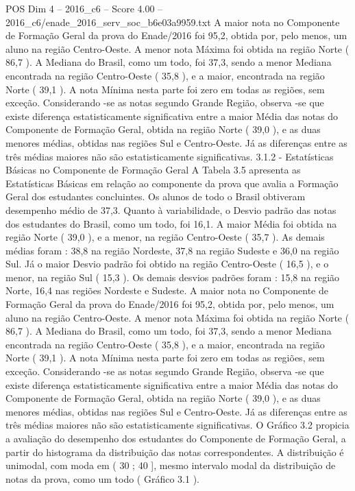 \begin{textsample}{POS Dim 4 – 2016\_c6 – Score 4.00 – 2016\_c6/enade\_2016\_serv\_soc\_b6e03a9959.txt}
A maior nota no Componente de Formação Geral da prova do Enade/2016 foi 95,2, obtida por, pelo menos, um aluno na região Centro-Oeste.
A menor nota Máxima foi obtida na região Norte ( 86,7 ).
A Mediana do Brasil, como um todo, foi 37,3, sendo a menor Mediana encontrada na região Centro-Oeste ( 35,8 ), e a maior, encontrada na região Norte ( 39,1 ).
A nota Mínima nesta parte foi zero em todas as regiões, sem exceção.
Considerando -se as notas segundo Grande Região, observa -se que existe diferença estatisticamente significativa entre a maior Média das notas do Componente de Formação Geral, obtida na região Norte ( 39,0 ), e as duas menores médias, obtidas nas regiões Sul e Centro-Oeste.
Já as diferenças entre as três médias maiores não são estatisticamente significativas. 3.1.2 - Estatísticas Básicas no Componente de Formação Geral A Tabela 3.5 apresenta as Estatísticas Básicas em relação ao componente da prova que avalia a Formação Geral dos estudantes concluintes.
Os alunos de todo o Brasil obtiveram desempenho médio de 37,3.
Quanto à variabilidade, o Desvio padrão das notas dos estudantes do Brasil, como um todo, foi 16,1.
A maior Média foi obtida na região Norte ( 39,0 ), e a menor, na região Centro-Oeste ( 35,7 ).
As demais médias foram : 38,8 na região Nordeste, 37,8 na região Sudeste e 36,0 na região Sul.
Já o maior Desvio padrão foi obtido na região Centro-Oeste ( 16,5 ), e o menor, na região Sul ( 15,3 ).
Os demais desvios padrões foram : 15,8 na região Norte, 16,4 nas regiões Nordeste e Sudeste.
A maior nota no Componente de Formação Geral da prova do Enade/2016 foi 95,2, obtida por, pelo menos, um aluno na região Centro-Oeste.
A menor nota Máxima foi obtida na região Norte ( 86,7 ).
A Mediana do Brasil, como um todo, foi 37,3, sendo a menor Mediana encontrada na região Centro-Oeste ( 35,8 ), e a maior, encontrada na região Norte ( 39,1 ).
A nota Mínima nesta parte foi zero em todas as regiões, sem exceção.
Considerando -se as notas segundo Grande Região, observa -se que existe diferença estatisticamente significativa entre a maior Média das notas do Componente de Formação Geral, obtida na região Norte ( 39,0 ), e as duas menores médias, obtidas nas regiões Sul e Centro-Oeste.
Já as diferenças entre as três médias maiores não são estatisticamente significativas.
O Gráfico 3.2 propicia a avaliação do desempenho dos estudantes do Componente de Formação Geral, a partir do histograma da distribuição das notas correspondentes.
A distribuição é unimodal, com moda em ( 30 ; 40 ], mesmo intervalo modal da distribuição de notas da prova, como um todo ( Gráfico 3.1 ).

\end{textsample}
